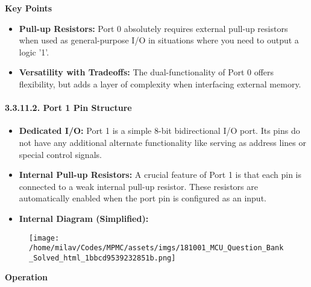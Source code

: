 \documentclass[
]{article}
\begin{document}
\textbf{Key Points}

\begin{itemize}
\item
  \textbf{Pull-up Resistors:} Port 0 absolutely requires external
  pull-up resistors when used as general-purpose I/O in situations where
  you need to output a logic '1'.
\item
  \textbf{Versatility with Tradeoffs:} The dual-functionality of Port 0
  offers flexibility, but adds a layer of complexity when interfacing
  external memory.
\end{itemize}

\hypertarget{33112-port-1-pin-structure}{%
\paragraph{3.3.11.2. Port 1 Pin
Structure}\label{33112-port-1-pin-structure}}

\begin{itemize}
\item
  \textbf{Dedicated I/O:} Port 1 is a simple 8-bit bidirectional I/O
  port. Its pins do not have any additional alternate functionality like
  serving as address lines or special control signals.
\item
  \textbf{Internal Pull-up Resistors:} A crucial feature of Port 1 is
  that each pin is connected to a weak internal pull-up resistor. These
  resistors are automatically enabled when the port pin is configured as
  an input.
\item
  \textbf{Internal Diagram (Simplified):}
\end{itemize}

\begin{figure}
\centering
\texttt{[image: /home/milav/Codes/MPMC/assets/imgs/181001\_MCU\_Question\_Bank\_Solved\_html\_1bbcd9539232851b.png]}
\caption{}
\end{figure}

\textbf{Operation}
\end{document}
